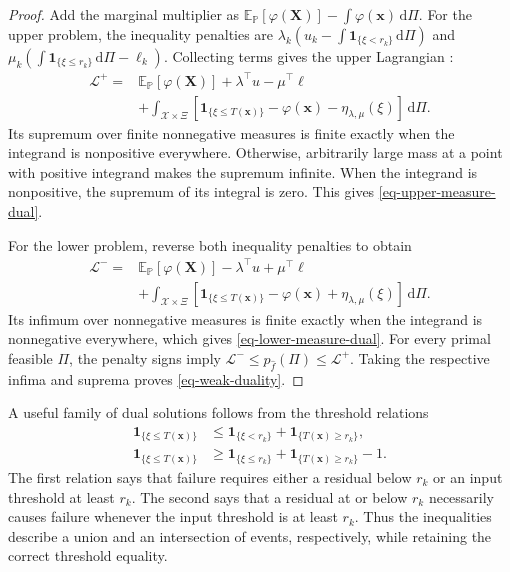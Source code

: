 \begin{proof}
  Add the marginal multiplier as $\mathbb E_{\mathbb P}[\varphi(\bm X)]-\int\varphi(\bm x)\,\mathrm d\Pi$. For the upper problem, the inequality penalties are $\lambda_k(u_k-\int\mathbf1_{\{\xi<r_k\}}\,\mathrm d\Pi)$ and $\mu_k(\int\mathbf1_{\{\xi\le r_k\}}\,\mathrm d\Pi-\ell_k)$. Collecting terms gives the upper Lagrangian \citep[Section~5.1]{B.V04}:
  \begin{equation}
    \begin{aligned}
      \mathcal L^+={}&\mathbb E_{\mathbb P}\left[\varphi(\bm X)\right]+\lambda^\top u-\mu^\top\ell\\
      &+\int_{\mathcal X\times\Xi}
      \left[\mathbf1_{\{\xi\le T(\bm x)\}}-\varphi(\bm x)-\eta_{\lambda,\mu}(\xi)\right]\,\mathrm d\Pi.
    \end{aligned}
    \label{eq-upper-lagrangian}
  \end{equation}
  Its supremum over finite nonnegative measures is finite exactly when the integrand is nonpositive everywhere. Otherwise, arbitrarily large mass at a point with positive integrand makes the supremum infinite. When the integrand is nonpositive, the supremum of its integral is zero. This gives \eqref{eq-upper-measure-dual}.

  For the lower problem, reverse both inequality penalties to obtain
  \begin{equation}
    \begin{aligned}
      \mathcal L^-={}&\mathbb E_{\mathbb P}\left[\varphi(\bm X)\right]-\lambda^\top u+\mu^\top\ell\\
      &+\int_{\mathcal X\times\Xi}
      \left[\mathbf1_{\{\xi\le T(\bm x)\}}-\varphi(\bm x)+\eta_{\lambda,\mu}(\xi)\right]\,\mathrm d\Pi.
    \end{aligned}
    \label{eq-lower-lagrangian}
  \end{equation}
  Its infimum over nonnegative measures is finite exactly when the integrand is nonnegative everywhere, which gives \eqref{eq-lower-measure-dual}. For every primal feasible $\Pi$, the penalty signs imply $\mathcal L^-\le p_{\hat f}(\Pi)\le\mathcal L^+$. Taking the respective infima and suprema proves \eqref{eq-weak-duality}.
\end{proof}

A useful family of dual solutions follows from the threshold relations
\begin{align}
  \mathbf1_{\{\xi\le T(\bm x)\}}
  &\le\mathbf1_{\{\xi<r_k\}}+\mathbf1_{\{T(\bm x)\ge r_k\}},
  \label{eq-upper-threshold-certificate}\\
  \mathbf1_{\{\xi\le T(\bm x)\}}
  &\ge\mathbf1_{\{\xi\le r_k\}}+\mathbf1_{\{T(\bm x)\ge r_k\}}-1.
  \label{eq-lower-threshold-certificate}
\end{align}
The first relation says that failure requires either a residual below $r_k$ or an input threshold at least $r_k$. The second says that a residual at or below $r_k$ necessarily causes failure whenever the input threshold is at least $r_k$. Thus the inequalities describe a union and an intersection of events, respectively, while retaining the correct threshold equality.

